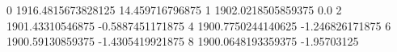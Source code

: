 0 1916.4815673828125 14.459716796875
1 1902.0218505859375 0.0
2 1901.43310546875 -0.5887451171875
4 1900.7750244140625 -1.246826171875
6 1900.59130859375 -1.4305419921875
8 1900.0648193359375 -1.95703125
